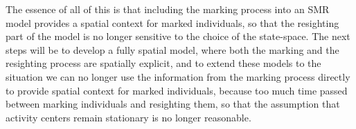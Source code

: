 The essence of all of this is that including the marking process into an SMR model provides a spatial context for marked individuals, so that the resighting part of the model is no longer sensitive to the choice of the state-space. The next steps will be to develop a fully spatial model, where both the marking and the resighting process are spatially explicit, and to extend these models to the situation we can no longer use the information from the marking process directly to provide spatial context for marked individuals, because too much time passed between marking individuals and resighting them, so that the assumption that activity centers remain stationary is no longer reasonable.






